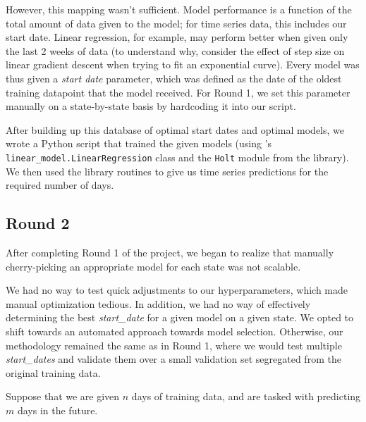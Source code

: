 \documentclass[sigconf,nonacm]{acmart}
\begin{document}
However, this mapping wasn't sufficient. 
Model performance is a function of the total amount of data given to the model;
for time series data, this includes our start date. Linear regression, for
example, may perform better when given only the last 2 weeks of data (to
understand why, consider the effect of step size on linear gradient descent
when trying to fit an exponential curve). 
Every model was thus given a \emph{start date} parameter, which was defined as
the date of the oldest training datapoint that the model received. 
For Round 1, we set this parameter manually on a state-by-state basis by
hardcoding it into our script. 

After building up this database of optimal start dates and optimal models, we
wrote a Python script that trained the given models (using \cite{scikit-learn}'s
\texttt{linear\_model.LinearRegression} class and the \texttt{Holt} module from
the \cite{statsmodels} library). We then used the library routines to give us
time series predictions for the required number of days. 

\subsection{Round 2}

After completing Round 1 of the project, we began to realize that manually
cherry-picking an appropriate model for each state was not scalable. 

We had no way to test quick adjustments to our hyperparameters, which made
manual optimization tedious. In addition, we had no way of effectively
determining the best \emph{start\_date} for a given model on a given state. 
We opted to shift towards an automated approach towards model selection. 
Otherwise, our methodology remained the same as in Round 1, where we would test
multiple \emph{start\_dates} and validate them over a small validation set segregated
from the original training data.

Suppose that we are given $n$ days of training data, and are tasked with
predicting $m$ days in the future. 
\end{document}
